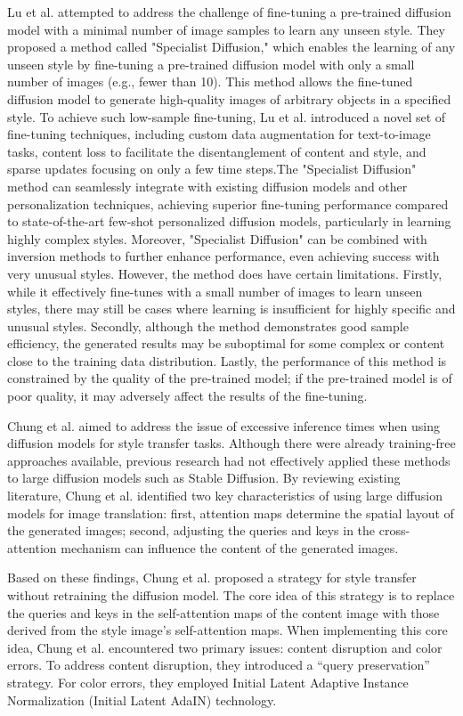 \documentclass[preprint,12pt]{elsarticle}
\begin{document}
Lu et al.\citep{65lu2023specialist} attempted to address the challenge of fine-tuning a pre-trained diffusion model with a minimal number of image samples to learn any unseen style. They proposed a method called "Specialist Diffusion," which enables the learning of any unseen style by fine-tuning a pre-trained diffusion model with only a small number of images (e.g., fewer than 10). This method allows the fine-tuned diffusion model to generate high-quality images of arbitrary objects in a specified style. To achieve such low-sample fine-tuning, Lu et al. introduced a novel set of fine-tuning techniques, including custom data augmentation for text-to-image tasks, content loss to facilitate the disentanglement of content and style, and sparse updates focusing on only a few time steps.The "Specialist Diffusion" method can seamlessly integrate with existing diffusion models and other personalization techniques, achieving superior fine-tuning performance compared to state-of-the-art few-shot personalized diffusion models, particularly in learning highly complex styles. Moreover, "Specialist Diffusion" can be combined with inversion methods to further enhance performance, even achieving success with very unusual styles. However, the method does have certain limitations. Firstly, while it effectively fine-tunes with a small number of images to learn unseen styles, there may still be cases where learning is insufficient for highly specific and unusual styles. Secondly, although the method demonstrates good sample efficiency, the generated results may be suboptimal for some complex or content close to the training data distribution. Lastly, the performance of this method is constrained by the quality of the pre-trained model; if the pre-trained model is of poor quality, it may adversely affect the results of the fine-tuning. 

Chung et al.\citep{66chung2024style} aimed to address the issue of excessive inference times when using diffusion models for style transfer tasks. Although there were already training-free approaches available, previous research had not effectively applied these methods to large diffusion models such as Stable Diffusion. By reviewing existing literature, Chung et al. identified two key characteristics of using large diffusion models for image translation: first, attention maps determine the spatial layout of the generated images; second, adjusting the queries and keys in the cross-attention mechanism can influence the content of the generated images.

Based on these findings, Chung et al. proposed a strategy for style transfer without retraining the diffusion model. The core idea of this strategy is to replace the queries and keys in the self-attention maps of the content image with those derived from the style image’s self-attention maps. When implementing this core idea, Chung et al. encountered two primary issues: content disruption and color errors. To address content disruption, they introduced a “query preservation” strategy. For color errors, they employed Initial Latent Adaptive Instance Normalization (Initial Latent AdaIN) technology.
\end{document}
